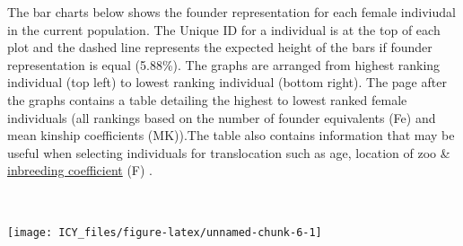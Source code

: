 \documentclass[12pt,]{article}
\begin{document}
The bar charts below shows the founder representation for each female
indiviudal in the current population. The Unique ID for a individual is
at the top of each plot and the dashed line represents the expected
height of the bars if founder representation is equal (5.88\%). The
graphs are arranged from highest ranking individual (top left) to lowest
ranking individual (bottom right). The page after the graphs contains a
table detailing the highest to lowest ranked female individuals (all
rankings based on the number of founder equivalents (Fe) and mean
kinship coefficients (MK)).The table also contains information that may
be useful when selecting individuals for translocation such as age,
location of zoo \& \hyperlink{term4}{inbreeding coefficient} (F)
.\newline  

~ ~ ~

\texttt{[image: ICY\_files/figure-latex/unnamed-chunk-6-1]} \newpage
\end{document}
